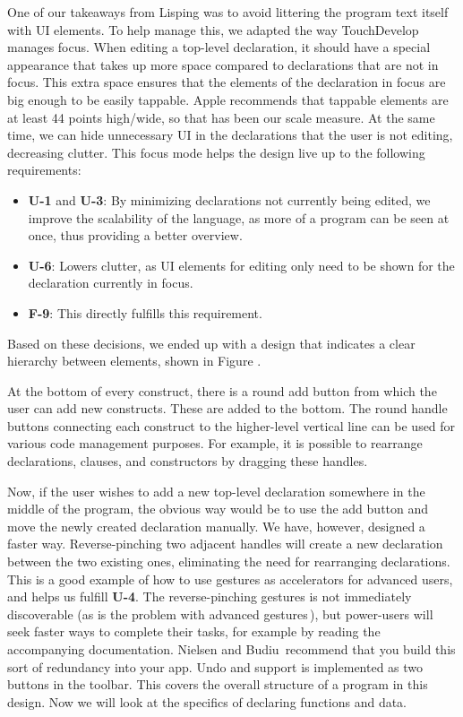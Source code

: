 One of our takeaways from Lisping was to avoid littering the program text itself with UI elements.
To help manage this, we adapted the way TouchDevelop manages focus.
When editing a top-level declaration, it should have a special appearance that takes up more space compared to declarations that are not in focus.
This extra space ensures that the elements of the declaration in focus are big enough to be easily tappable. 
Apple recommends that tappable elements are at least 44 points high/wide, so that has been our scale measure.
At the same time, we can hide unnecessary UI in the declarations that the user is not editing, decreasing clutter.
This focus mode helps the design live up to the following requirements:
\begin{itemize}
	\item \textbf{U-1} and \textbf{U-3}: By minimizing declarations not currently being edited, we improve the scalability of the language, as more of a program can be seen at once, thus providing a better overview.
	\item \textbf{U-6}: Lowers clutter, as UI elements for editing only need to be shown for the declaration currently in focus.
	\item \textbf{F-9}: This directly fulfills this requirement.
\end{itemize}

Based on these decisions, we ended up with a design that indicates a clear hierarchy between elements, shown in Figure .

\missingfigure{}

At the bottom of every construct, there is a round add button from which the user can add new constructs. These are added to the bottom. 
The round handle buttons connecting each construct to the higher-level vertical line can be used for various code management purposes. 
For example, it is possible to rearrange declarations, clauses, and constructors by dragging these handles. 

Now, if the user wishes to add a new top-level declaration somewhere in the middle of the program, the obvious way would be to use the add button and move the newly created declaration manually. We have, however, designed a faster way.
Reverse-pinching two adjacent handles will create a new declaration between the two existing ones, eliminating the need for rearranging declarations. 
This is a good example of how to use gestures as accelerators for advanced users, and helps us fulfill \textbf{U-4}.
The reverse-pinching gestures is not immediately discoverable (as is the problem with advanced gestures\,\cite[p 141]{nielsen2013mobile}), but power-users will seek faster ways to complete their tasks, for example by reading the accompanying documentation. 
Nielsen and Budiu\,\cite[p 143]{nielsen2013mobile} recommend that you build this sort of redundancy into your app. 
Undo and support is implemented as two buttons in the toolbar.
This covers the overall structure of a program in this design. Now we will look at the specifics of declaring functions and data.

